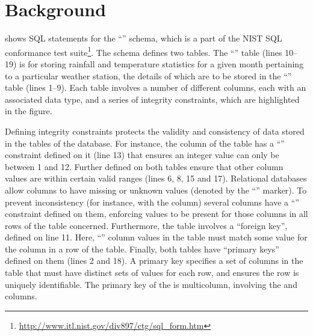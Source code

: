 
\vspace*{-1em}

\section{Background}
\label{sec:background}



\vspace{-2mm}
 shows SQL  statements for the ``\NistWeather'' schema, which is a part of the NIST SQL conformance test suite\footnote{\small{\url{http://www.itl.nist.gov/div897/ctg/sql_form.htm}}}. The schema defines two tables. The ``'' table (lines 10--19) is for storing rainfall and temperature statistics for a given month pertaining to a particular weather station, the details of which are to be  stored in the ``'' table (lines 1--9). Each table involves a number of different columns, each with an associated data type, and a series of integrity constraints, which are highlighted in the figure.

Defining integrity constraints protects the validity and consistency of data stored in the tables of the database. For instance, the  column of the  table has a ``\CHECK'' constraint defined on it (line 13) that ensures an integer  value can only be between 1 and 12. Further \CCs defined on both tables ensure that other column values are within certain valid ranges (lines 6, 8, 15 and 17). Relational databases allow columns to have missing or unknown values (denoted by the ``\NULL'' marker). To prevent inconsistency (for instance, with the  column) several columns have a ``\NOTNULL'' constraint defined on them, enforcing values to be present for those columns in all rows of the table concerned.
Furthermore, the  table involves a ``foreign key'', defined on line 11. Here, ``'' column values in the  table must match some value
for the  column in a row of the  table. Finally, both tables have ``primary keys'' defined on them (lines 2 and 18). A primary key specifies a set of columns in the table that must have distinct sets of values for each row, and ensures the row is uniquely identifiable.
The primary key of the  is multicolumn, involving the  and  columns.


